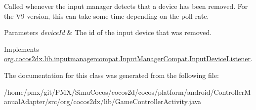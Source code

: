Called whenever the input manager detects that a device has been removed. For the V9 version, this can take some time depending on the poll rate.


\begin{DoxyParams}{Parameters}
{\em device\+Id} & The id of the input device that was removed. \\
\hline
\end{DoxyParams}


Implements \hyperlink{interfaceorg_1_1cocos2dx_1_1lib_1_1inputmanagercompat_1_1InputManagerCompat_1_1InputDeviceListener_acc46e40fb1f8cf48e7e1d241f59e5461}{org.\+cocos2dx.\+lib.\+inputmanagercompat.\+Input\+Manager\+Compat.\+Input\+Device\+Listener}.



The documentation for this class was generated from the following file\+:\begin{DoxyCompactItemize}
\item 
/home/pmx/git/\+P\+M\+X/\+Simu\+Cocos/cocos2d/cocos/platform/android/\+Controller\+Manual\+Adapter/src/org/cocos2dx/lib/Game\+Controller\+Activity.\+java\end{DoxyCompactItemize}
